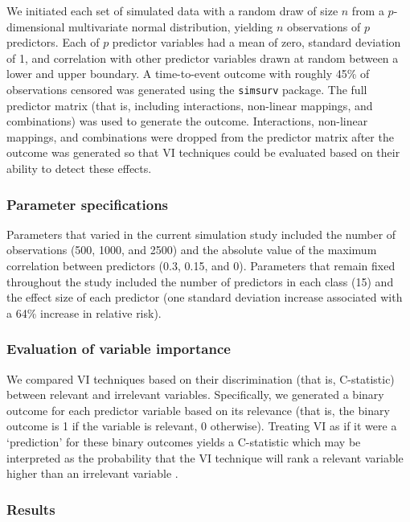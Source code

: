 \documentclass[twoside,11pt]{article}\usepackage[]{graphicx}\usepackage[]{xcolor}
\newcommand{\ie}{that is}
\begin{document}
We initiated each set of simulated data with a random draw of size $n$ from a $p$-dimensional multivariate normal distribution, yielding $n$ observations of $p$ predictors. Each of $p$ predictor variables had a mean of zero, standard deviation of 1, and correlation with other predictor variables drawn at random between a lower and upper boundary. A time-to-event outcome with roughly 45\% of observations censored was generated using the \texttt{simsurv} package. The full predictor matrix (\ie, including interactions, non-linear mappings, and combinations) was used to generate the outcome. Interactions, non-linear mappings, and combinations were dropped from the predictor matrix after the outcome was generated so that VI techniques could be evaluated based on their ability to detect these effects.

\subsubsection{Parameter specifications}




Parameters that varied in the current simulation study included the number of observations (500, 1000, and 2500) and the absolute value of the maximum correlation between predictors (0.3, 0.15, and 0). Parameters that remain fixed throughout the study included the number of predictors in each class (15) and the effect size of each predictor (one standard deviation increase associated with a 64\% increase in relative risk).

\subsubsection{Evaluation of variable importance}

We compared VI techniques based on their discrimination (\ie, C-statistic) between relevant and irrelevant variables. Specifically, we generated a binary outcome for each predictor variable based on its relevance (\ie, the binary outcome is 1 if the variable is relevant, 0 otherwise). Treating VI as if it were a ‘prediction’ for these binary outcomes yields a C-statistic which may be interpreted as the probability that the VI technique will rank a relevant variable higher than an irrelevant variable \citep{harrell1982evaluating}.

\subsubsection{Results} \label{sec:results_vi}
\end{document}

